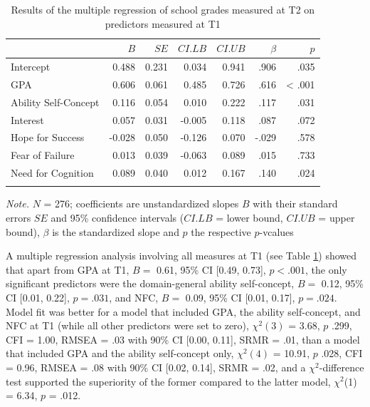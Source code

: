 \documentclass[
  man]{apa6}
\begin{document}
\begin{table}[tbp]

\begin{center}
\begin{threeparttable}

\caption{\label{tab:mr}Results of the multiple regression of school grades measured at T2 on predictors measured at T1}

\begin{tabular}{lrrrrrr}
\toprule
 & $B$ & $SE$ & $CI.LB$ & $CI.UB$ & $\beta$ & $p$\\
\midrule
Intercept & 0.488 & 0.231 & 0.034 & 0.941 & .906 & .035\\
GPA & 0.606 & 0.061 & 0.485 & 0.726 & .616 & < .001\\
Ability Self-Concept & 0.116 & 0.054 & 0.010 & 0.222 & .117 & .031\\
Interest & 0.057 & 0.031 & -0.005 & 0.118 & .087 & .072\\
Hope for Success & -0.028 & 0.050 & -0.126 & 0.070 & -.029 & .578\\
Fear of Failure & 0.013 & 0.039 & -0.063 & 0.089 & .015 & .733\\
Need for Cognition & 0.089 & 0.040 & 0.012 & 0.167 & .140 & .024\\
\bottomrule
\addlinespace
\end{tabular}

\begin{tablenotes}[para]
\normalsize{\textit{Note.} $N$ = 276; coefficients are unstandardized slopes $B$ with their standard errors $SE$ and 95\% confidence intervals ($CI.LB$ = lower bound, $CI.UB$ = upper bound), $\beta$ is the standardized slope and $p$ the respective $p$-vcalues}
\end{tablenotes}

\end{threeparttable}
\end{center}

\end{table}

A multiple regression analysis involving all measures at T1 (see Table \ref{tab:mr}) showed that apart from GPA at T1, \(B=\) 0.61, 95\% CI {[}0.49, 0.73{]}, \(p< .001\), the only significant predictors were the domain-general ability self-concept, \(B=\) 0.12, 95\% CI {[}0.01, 0.22{]}, \(p=.031\), and NFC, \(B=\) 0.09, 95\% CI {[}0.01, 0.17{]}, \(p=.024\). Model fit was better for a model that included GPA, the ability self-concept, and NFC at T1 (while all other predictors were set to zero), \(\chi^2(3)\) = 3.68, \(p\) .299, CFI = 1.00, RMSEA = .03 with 90\% CI {[}0.00, 0.11{]}, SRMR = .01, than a model that included GPA and the ability self-concept only, \(\chi^2(4)\) = 10.91, \(p\) .028, CFI = 0.96, RMSEA = .08 with 90\% CI {[}0.02, 0.14{]}, SRMR = .02, and a \(\chi^2\)-difference test supported the superiority of the former compared to the latter model, \(\chi^2\)(1) = 6.34, \(p\) = .012.
\end{document}
